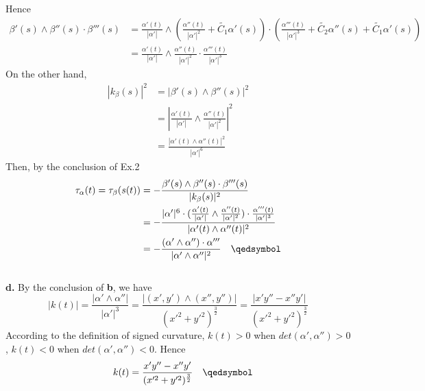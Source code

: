 \documentclass{article}
\begin{document}
Hence
$$
\begin{aligned}
    \beta'(s) \wedge \beta''(s) \cdot \beta'''(s) &= \frac{\alpha'(t)}{|\alpha'|} \wedge (\frac{\alpha''(t)}{|\alpha'|^2} + \tilde{C_1} \alpha'(s)) \cdot (\frac{\alpha'''(t)}{|\alpha'|^3} + \tilde{C_2}\alpha''(s) + \tilde{C_1}\alpha'(s)) \\
    &=\frac{\alpha'(t)}{|\alpha'|} \wedge \frac{\alpha''(t)}{|\alpha'|^2} \cdot \frac{\alpha'''(t)}{|\alpha'|^3}
\end{aligned}
$$
On the other hand,
$$
\begin{aligned}
    |k_{\beta}(s)|^2 &= |\beta'(s) \wedge \beta''(s)|^2 \\
    &= |\frac{\alpha'(t)}{|\alpha'|} \wedge \frac{\alpha''(t)}{|\alpha'|^2}|^2\\
    &= \frac{|\alpha'(t) \wedge \alpha''(t)|^2}{|\alpha'|^6}
\end{aligned}
$$
Then, by the conclusion of Ex.2
$$
\begin{aligned}
    \tau_{\alpha}(t) = \tau_{\beta}(s(t)) &=-\frac{\beta'(s) \wedge \beta''(s) \cdot \beta'''(s)}{|k_{\beta}(s)|^2}\\
    &= -\frac{|\alpha'|^6 \cdot (\frac{\alpha'(t)}{|\alpha'|} \wedge \frac{\alpha''(t)}{|\alpha'|^2}) \cdot \frac{\alpha'''(t)}{|\alpha'|^3}}{|\alpha'(t) \wedge \alpha''(t)|^2}\\
    &= -\frac{(\alpha' \wedge \alpha'') \cdot \alpha'''}{|\alpha' \wedge \alpha''|^2} \quad \qedsymbol
\end{aligned}
$$
\\
\textbf{d. }By the conclusion of \textbf{b}, we have
$$
    |k(t)| = \frac{|\alpha' \wedge \alpha''|}{|\alpha'|^3}
    = \frac{|(x', y') \wedge (x'', y'')|}{(x'^2+y'^2)^{\frac{3}{2}}} = \frac{|x'y''-x''y'|}{(x'^2+y'^2)^{\frac{3}{2}}}
$$
According to the definition of signed curvature, $k(t)>0$ when $det(\alpha', \alpha'')>0$, $k(t)<0$ when
$det(\alpha', \alpha'')<0$. Hence
$$
    \quad k(t) = \frac{x'y''-x''y'}{(x'^2+y'^2)^{\frac{3}{2}}} \quad \qedsymbol
$$
\end{document}
